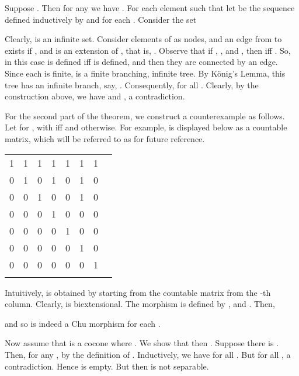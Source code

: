 \documentclass{LMCS}
\begin{document}
Suppose . Then for any  we have
. For each element  such that
 let  be
the sequence defined inductively by  and
 for each . 
Consider the set

Clearly,  is an infinite set.  Consider elements of  as nodes,
and an edge from  to  exists if , and
 is an extension of , that is, . 
Observe that if , , and , then  iff
. So, in this case 
is defined iff  is defined, and then they are connected by
an edge. Since each  is finite,  is a finite branching,
infinite tree.  By K\"{o}nig's Lemma, this tree has an infinite
branch, say, .  Consequently,  for all .  Clearly, by the construction
above, we have  and , a contradiction. 

For the second part of the theorem, we construct a counterexample as
follows. Let  for , with  iff  and
 otherwise. For example,  is displayed below as
a countable matrix, which will be referred to as  for future
reference. 

\begin{center}
\begin{tabular}{| c c c  c  c  c c c c c  |}\hline
   1 & 1 & 1 & 1 & 1 & 1 & 1 &   \multicolumn{3}{c|}{} \\
   0 & 1 & 0 & 1 & 0 & 1 & 0 &   \multicolumn{3}{c|}{} \\
      0 & 0 & 1 & 0 & 0 & 1 & 0 &   \multicolumn{3}{c|}{}\\
            0 & 0 & 0 & 1 & 0 & 0 & 0 &   \multicolumn{3}{c|}{}\\
                        0 & 0 & 0 & 0 & 1 & 0 & 0 &   \multicolumn{3}{c|}{}\\
                         0 & 0 & 0 & 0 & 0 & 1 & 0 &   \multicolumn{3}{c|}{} \\
                               0 & 0 & 0 & 0 & 0 & 0 & 1 &  \multicolumn{3}{c|}{} \\
           \multicolumn{10}{|c|}{} \\ \hline
   \end{tabular}
\end{center}
Intuitively,  is obtained by starting
from the countable matrix  from the -th column. Clearly,  is biextensional. The morphism  is defined by , and
. Then,

and so  is indeed a Chu morphism for each . 


Now assume that  is a cocone
where . We show that then . Suppose
there is . Then, for any ,  by
the definition of . 
Inductively, we have  for all
.  But  for all ,
a contradiction.  Hence  is empty. But then  is not
separable. 
\end{document}
